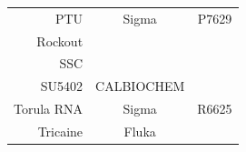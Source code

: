 \documentclass[11pt,singlespacinge,twoside]{reedthesis} %
\begin{document}
\begin{longtable}[]{@{}rcc@{}}
\begin{minipage}[t]{0.26\columnwidth}
PTU\strut
\end{minipage} & \begin{minipage}[t]{0.50\columnwidth}\centering
Sigma\strut
\end{minipage} & \begin{minipage}[t]{0.16\columnwidth}\centering
P7629\strut
\end{minipage}\tabularnewline
\begin{minipage}[t]{0.26\columnwidth}\raggedleft
Rockout\strut
\end{minipage} & \begin{minipage}[t]{0.50\columnwidth}\centering
\strut
\end{minipage} & \begin{minipage}[t]{0.16\columnwidth}\centering
\strut
\end{minipage}\tabularnewline
\begin{minipage}[t]{0.26\columnwidth}\raggedleft
SSC\strut
\end{minipage} & \begin{minipage}[t]{0.50\columnwidth}\centering
\strut
\end{minipage} & \begin{minipage}[t]{0.16\columnwidth}\centering
\strut
\end{minipage}\tabularnewline
\begin{minipage}[t]{0.26\columnwidth}\raggedleft
SU5402\strut
\end{minipage} & \begin{minipage}[t]{0.50\columnwidth}\centering
CALBIOCHEM\strut
\end{minipage} & \begin{minipage}[t]{0.16\columnwidth}\centering
572630\strut
\end{minipage}\tabularnewline
\begin{minipage}[t]{0.26\columnwidth}\raggedleft
Torula RNA\strut
\end{minipage} & \begin{minipage}[t]{0.50\columnwidth}\centering
Sigma\strut
\end{minipage} & \begin{minipage}[t]{0.16\columnwidth}\centering
R6625\strut
\end{minipage}\tabularnewline
\begin{minipage}[t]{0.26\columnwidth}\raggedleft
Tricaine\strut
\end{minipage} & \begin{minipage}[t]{0.50\columnwidth}\centering
Fluka\strut
\end{minipage} & \begin{minipage}[t]{0.16\columnwidth}\centering

\end{minipage}
\end{longtable}
\end{document}
